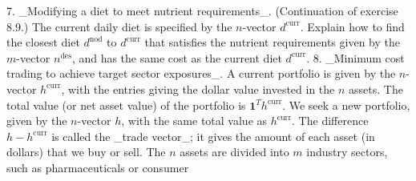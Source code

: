 7. _Modifying a diet to meet nutrient requirements_. (Continuation of exercise 8.9.) The current daily diet is specified by the \(n\)-vector \(d^{\mathrm{curr}}\). Explain how to find the closest diet \(d^{\mathrm{nod}}\) to \(d^{\mathrm{curr}}\) that satisfies the nutrient requirements given by the \(m\)-vector \(n^{\mathrm{des}}\), and has the same cost as the current diet \(d^{\mathrm{curr}}\).
8. _Minimum cost trading to achieve target sector exposures_. A current portfolio is given by the \(n\)-vector \(h^{\mathrm{curr}}\), with the entries giving the dollar value invested in the \(n\) assets. The total value (or net asset value) of the portfolio is \(\mathbf{1}^{T}h^{\mathrm{curr}}\). We seek a new portfolio, given by the \(n\)-vector \(h\), with the same total value as \(h^{\mathrm{curr}}\). The difference \(h-h^{\mathrm{curr}}\) is called the _trade vector_; it gives the amount of each asset (in dollars) that we buy or sell. The \(n\) assets are divided into \(m\) industry sectors, such as pharmaceuticals or consumer